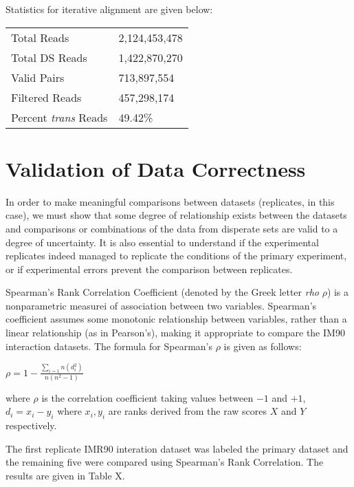 \documentclass[phd,tocprelim]{cornell}
\begin{document}
Statistics for iterative alignment are given below:

\begin{center}
  \begin{table}
    \begin{tabular}{l l}
    \toprule
    Total Reads & 2,124,453,478 \\
    Total DS Reads & 1,422,870,270 \\
    Valid Pairs & 713,897,554 \\
    Filtered Reads & 457,298,174 \\
    Percent \textit{trans} Reads & 49.42\% \\
    \bottomrule
    \end{tabular}
  \end{table}
\end{center}


\chapter{Validation of Data Correctness}

In order to make meaningful comparisons between datasets (replicates,
in this case), we must show that some degree of relationship exists between
the datasets and comparisons or combinations of the data from disperate sets
are valid to a degree of uncertainty.  It is also essential to understand if the
experimental replicates indeed managed to replicate the conditions of the primary
experiment, or if experimental errors prevent the comparison between replicates.

Spearman's Rank Correlation Coefficient (denoted by the Greek letter \textit{rho}
$\rho$) is a nonparametric measurei of association between two variables.
Spearman's coefficient assumes some monotonic relationship between variables,
rather than a linear relationship (as in Pearson's), making it appropriate
to compare the IM90 interaction datasets.  The formula for Spearman's $\rho$ is
given as follows:

$
\rho = 1 - \frac{\sum_{i=1}{n}(d_i^2)}{n(n^2 - 1)}
$

where $\rho$ is the correlation coefficient taking values between $-1$ and $+1$,
$d_i = x_i - y_i$ where $x_i, y_i$ are ranks derived from the raw scores $X$ and
$Y$ respectively.

The first replicate IMR90 interation dataset was labeled the primary dataset
and the remaining five were compared using Spearman's Rank Correlation.  The
results are given in Table X.
\end{document}
